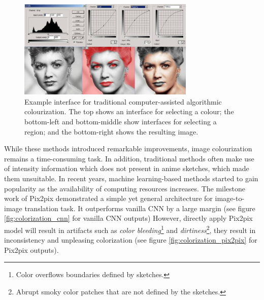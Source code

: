 \begin{figure}
    \centering
    \includegraphics[width=0.75\textwidth]{images/colorization/computer_assisted_colorization.jpg}
    \caption[Example interface for traditional computer-assisted algorithmic colourization.]{Example interface for traditional computer-assisted algorithmic colourization. The top shows an interface for selecting a colour; the bottom-left and bottom-middle show interfaces for selecting a region; and the bottom-right shows the resulting image.\cite{ColorizeBlackWhite}}
    \label{fig:computer_assisted_colorization}
\end{figure}

While these methods introduced remarkable improvements, image colourization remains a time-consuming task. In addition, traditional methods often make use of intensity information which does not present in anime sketches, which made them unsuitable. In recent years, machine learning-based methods started to gain popularity as the availability of computing resources increases. The milestone work of Pix2pix\cite{isolaImagetoImageTranslationConditional2018} demonstrated a simple yet general architecture for image-to-image translation task. It outperforms vanilla CNN by a large margin (see figure \ref{fig:colorization_cnn} for vanilla CNN outputs) However, directly apply Pix2pix model will result in artifacts such as \textit{color bleeding}\footnote{Color overflows boundaries defined by sketches.} and \textit{dirtiness}\footnote{Abrupt smoky color patches that are not defined by the sketches.}, they result in inconsistency and unpleasing colorization (see figure \ref{fig:colorization_pix2pix} for Pix2pix outputs). 

